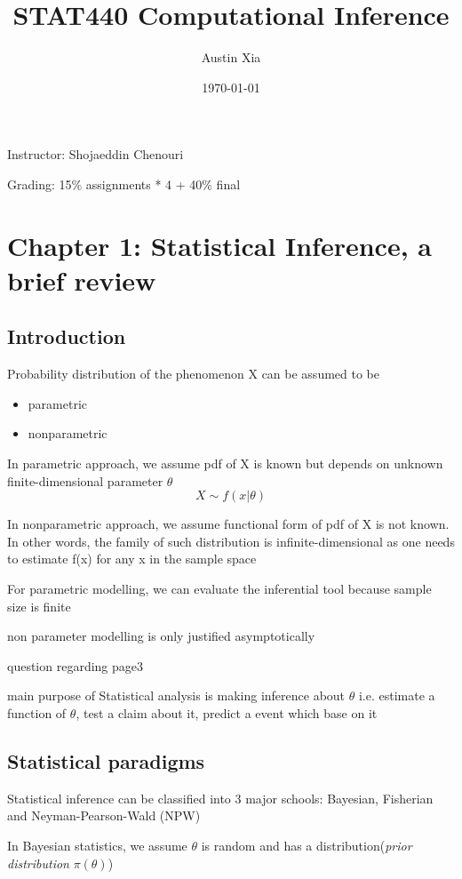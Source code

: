 \documentclass[10pt]{article}
\theoremstyle{break}
\begin{document}
\let\ref\Cref

\title{\bf{STAT440 Computational Inference}}
\date{\today}
\author{Austin Xia}

\maketitle
\newpage
\tableofcontents
\listoffigures
\listoftables
\newpage
Instructor: Shojaeddin Chenouri

Grading: 15\% assignments * 4 + 40\% final
\section{Chapter 1: Statistical Inference, a brief review}
\subsection{Introduction}
Probability distribution of the phenomenon X can be assumed to be 
\begin{itemize}
    \item parametric 
    \item nonparametric 
\end{itemize}

In parametric approach, we assume pdf of X is known but depends on unknown finite-dimensional parameter $\theta$
$$X\sim f(x|\theta)$$

In nonparametric approach, we assume functional form of pdf of X is not known. In other words,
the family of such distribution is infinite-dimensional as one 
needs to estimate f(x) for any x in the sample space

For parametric modelling, we can evaluate the inferential tool because sample size is finite 

non parameter modelling is only justified asymptotically

question regarding page3

main purpose of Statistical analysis is making inference about $\theta$
i.e. estimate a function of $\theta$, test a claim about it, predict a event which base on it 

\subsection{Statistical paradigms}
Statistical inference can be classified into 3 major schools:
Bayesian, Fisherian and Neyman-Pearson-Wald (NPW)

In Bayesian statistics, we assume $\theta$ is random and has a distribution(\emph{prior distribution} $\pi(\theta)$)
\end{document}
